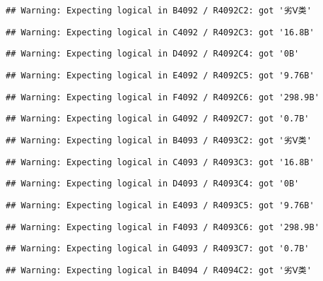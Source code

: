 \documentclass[
]{article}
\begin{document}
\begin{verbatim}
## Warning: Expecting logical in B4092 / R4092C2: got '劣Ⅴ类'
\end{verbatim}

\begin{verbatim}
## Warning: Expecting logical in C4092 / R4092C3: got '16.8B'
\end{verbatim}

\begin{verbatim}
## Warning: Expecting logical in D4092 / R4092C4: got '0B'
\end{verbatim}

\begin{verbatim}
## Warning: Expecting logical in E4092 / R4092C5: got '9.76B'
\end{verbatim}

\begin{verbatim}
## Warning: Expecting logical in F4092 / R4092C6: got '298.9B'
\end{verbatim}

\begin{verbatim}
## Warning: Expecting logical in G4092 / R4092C7: got '0.7B'
\end{verbatim}

\begin{verbatim}
## Warning: Expecting logical in B4093 / R4093C2: got '劣Ⅴ类'
\end{verbatim}

\begin{verbatim}
## Warning: Expecting logical in C4093 / R4093C3: got '16.8B'
\end{verbatim}

\begin{verbatim}
## Warning: Expecting logical in D4093 / R4093C4: got '0B'
\end{verbatim}

\begin{verbatim}
## Warning: Expecting logical in E4093 / R4093C5: got '9.76B'
\end{verbatim}

\begin{verbatim}
## Warning: Expecting logical in F4093 / R4093C6: got '298.9B'
\end{verbatim}

\begin{verbatim}
## Warning: Expecting logical in G4093 / R4093C7: got '0.7B'
\end{verbatim}

\begin{verbatim}
## Warning: Expecting logical in B4094 / R4094C2: got '劣Ⅴ类'
\end{verbatim}
\end{document}
